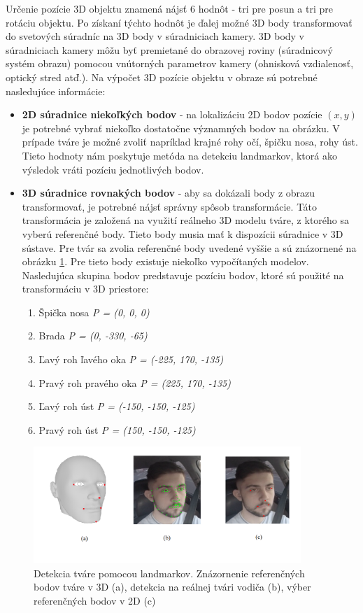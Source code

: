\documentclass[slovak,master,dept460,male,cpp,cpdeclaration]{diploma}
\begin{document}
Určenie pozície 3D objektu znamená nájsť 6 hodnôt  - tri pre posun a tri pre rotáciu objektu. Po získaní týchto hodnôt je ďalej možné 3D body transformovať do svetových súradníc na 3D body v súradniciach kamery. 3D body v súradniciach kamery môžu byť premietané do obrazovej roviny (súradnicový systém obrazu) pomocou vnútorných parametrov kamery (ohnisková vzdialenosť, optický stred atď.). Na výpočet 3D pozície objektu v obraze sú potrebné nasledujúce informácie:
\begin{itemize}
\item\textbf{2D súradnice niekoľkých bodov} - na lokalizáciu 2D bodov pozície  $(x, y )$ je potrebné vybrať niekoľko dostatočne významných bodov na obrázku. V prípade tváre je možné zvoliť napríklad krajné rohy očí, špičku nosa, rohy úst. Tieto hodnoty nám poskytuje metóda na detekciu landmarkov, ktorá ako výsledok vráti pozíciu jednotlivých bodov.
\item\textbf{3D súradnice rovnakých bodov}  - aby sa dokázali body z obrazu transformovať, je potrebné nájsť správny spôsob transformácie. Táto transformácia je založená na využití reálneho 3D modelu tváre, z ktorého  sa vyberú referenčné body. Tieto body musia mať k dispozícii súradnice v 3D sústave. Pre tvár sa zvolia referenčné body uvedené vyššie a sú znázornené na obrázku \ref{fig:landmarkPoints}. Pre tieto body existuje niekoľko  vypočítaných modelov. Nasledujúca skupina bodov predstavuje pozíciu bodov, ktoré sú použité  na transformáciu v 3D priestore:
\begin{enumerate}
  \item Špička nosa \textit{P = (0, 0, 0)}
  \item Brada \textit{P = (0, -330, -65)}
  \item Ľavý roh ľavého oka \textit{P = (-225, 170, -135)}
  \item Pravý roh pravého oka \textit{P = (225, 170, -135)}
  \item Ľavý roh úst \textit{P = (-150, -150, -125)}
  \item Pravý roh úst \textit{P = (150, -150, -125)}
\end{enumerate}
\end{itemize}

\begin{figure}[H]
	\centering
	\includegraphics[width=0.9\textwidth]{Figures/landmarkPoints.png}
	\caption{Detekcia tváre pomocou landmarkov. Znázornenie referenčných bodov tváre v 3D\cite{headmodel} (a), detekcia na reálnej tvári vodiča (b), výber referenčných bodov v 2D (c)}
	\label{fig:landmarkPoints}
\end{figure}
\end{document}
